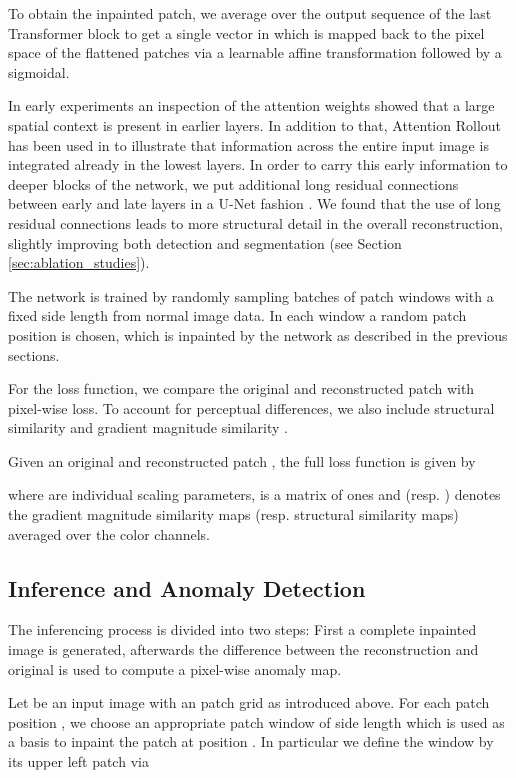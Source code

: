 \documentclass[runningheads]{llncs}
\begin{document}
To obtain the inpainted patch, we average over the output sequence of the last Transformer block to get a single vector in  which is mapped back to the pixel space of the flattened patches  via a learnable affine transformation followed by a sigmoidal.

In early experiments an inspection of the attention weights showed that a large spatial context is present in earlier layers. In addition to that, Attention Rollout \cite{attentionRollout} has been used in \cite{dosovitskiy2020} to illustrate that information across the entire input image is integrated already in the lowest layers. In order to carry this early information to deeper blocks of the network, we put additional long residual connections between early and late layers in a U-Net fashion \cite{10.1007/978-3-319-24574-4_28}. We found that the use of long residual connections leads to more structural detail in the overall reconstruction, slightly improving both detection and segmentation (see Section \ref{sec:ablation_studies}).

The network is trained by randomly sampling batches of patch windows with a fixed side length  from normal image data. In each window a random patch position  is chosen, which is inpainted by the network as described in the previous sections.

For the loss function, we compare the original and reconstructed patch with pixel-wise  loss. To account for perceptual differences, we also include structural similarity \cite{Wang2004ssim} and gradient magnitude similarity \cite{10.1109/TIP.2013.2293423}.

Given an original and reconstructed patch , the full loss function  is given by

where  are individual scaling parameters,  is a matrix of ones and  (resp. ) denotes the gradient magnitude similarity maps (resp. structural similarity maps) averaged over the color channels.

\subsection{Inference and Anomaly Detection}

The inferencing process is divided into two steps: First a complete inpainted image is generated, afterwards the difference between the reconstruction and original is used to compute a pixel-wise anomaly map.

Let  be an input image with an  patch grid as introduced above. For each patch position , we choose an appropriate patch window of side length  which is used as a basis to inpaint the patch at position . In particular we define the window by its upper left patch  via
\end{document}
